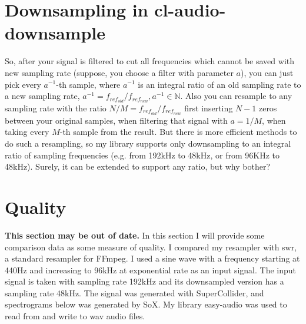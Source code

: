 \documentclass[a4paper,11pt,fleqn]{article}
\begin{document}
\section{Downsampling in cl-audio-downsample}
So, after your signal is filtered to cut all frequencies which cannot be saved with new sampling rate (suppose, you choose a filter with parameter $a$), you can just pick every $a^{-1}$-th sample, where
$a^{-1}$ is an integral ratio of an old sampling rate to a new sampling rate, $a^{-1} = f_{ref_{old}}/f_{ref_{new}}, a^{-1} \in \mathbb{N}$. Also you can resample to any sampling rate with the ratio
$N/M = f_{ref_{old}}/f_{ref_{new}}$ first inserting $N-1$ zeros between your original samples, when filtering that signal with $a=1/M$, when taking every $M$-th sample from the result. But there is more
efficient methods to do such a resampling, so my library supports only downsampling to an integral ratio of sampling frequencies (e.g. from 192kHz to 48kHz, or from 96KHz to 48kHz). Surely, it can be extended
to support any ratio, but why bother?

\section{Quality}
\textbf{This section may be out of date.}
In this section I will provide some comparison data as some measure of quality. I compared my resampler with swr, a standard resampler for FFmpeg. I used a sine wave with a frequency starting at 440Hz and increasing
to 96kHz at exponential rate as an input signal. The input signal is taken with sampling rate 192kHz and its downsampled version has a sampling rate 48kHz. The signal was generated with SuperCollider, and spectrograms
below was generated by SoX. My library easy-audio was used to read from and write to wav audio files.
\end{document}
